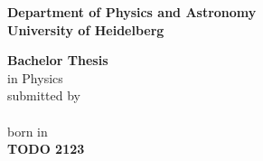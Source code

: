 \begin{titlepage}

\begin{center}
\vspace*{2cm}
\huge{\bf{Department of Physics and Astronomy}} \\
\vspace*{0.2cm}
\LARGE{\bf{University of Heidelberg}}
\end{center}
\vspace*{10cm}
\large
\begin{center}
{\bf{Bachelor Thesis}} \\
\vspace*{0.2cm}
in Physics\\
\vspace*{0.2cm}
submitted by\\
\vspace*{0.2cm}
\textbf{\thesisAuthor}\\
\vspace*{0.2cm}
born in \thesisAuthorBornIn\\
\vspace*{1cm}
\textbf{TODO 2123}
\end{center}

\end{titlepage}

